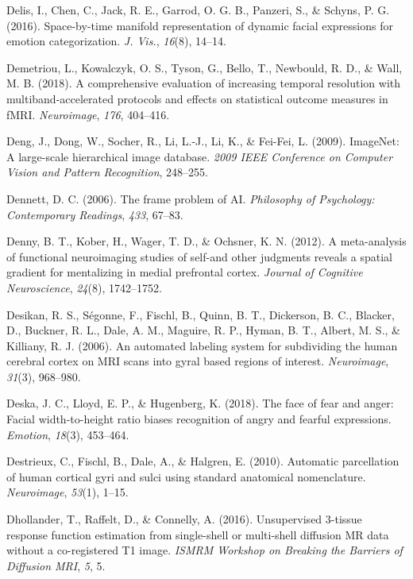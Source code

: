 \documentclass[11pt,american,a4paper,oneside,]{memoir} %
\begin{document}
\leavevmode\hypertarget{ref-Delis2016-zl}{}%
Delis, I., Chen, C., Jack, R. E., Garrod, O. G. B., Panzeri, S., \& Schyns, P. G. (2016). Space-by-time manifold representation of dynamic facial expressions for emotion categorization. \emph{J. Vis.}, \emph{16}(8), 14--14.

\leavevmode\hypertarget{ref-Demetriou2018-xp}{}%
Demetriou, L., Kowalczyk, O. S., Tyson, G., Bello, T., Newbould, R. D., \& Wall, M. B. (2018). A comprehensive evaluation of increasing temporal resolution with multiband-accelerated protocols and effects on statistical outcome measures in fMRI. \emph{Neuroimage}, \emph{176}, 404--416.

\leavevmode\hypertarget{ref-Deng2009-bp}{}%
Deng, J., Dong, W., Socher, R., Li, L.-J., Li, K., \& Fei-Fei, L. (2009). ImageNet: A large-scale hierarchical image database. \emph{2009 IEEE Conference on Computer Vision and Pattern Recognition}, 248--255.

\leavevmode\hypertarget{ref-Dennett2006-el}{}%
Dennett, D. C. (2006). The frame problem of AI. \emph{Philosophy of Psychology: Contemporary Readings}, \emph{433}, 67--83.

\leavevmode\hypertarget{ref-denny2012meta}{}%
Denny, B. T., Kober, H., Wager, T. D., \& Ochsner, K. N. (2012). A meta-analysis of functional neuroimaging studies of self-and other judgments reveals a spatial gradient for mentalizing in medial prefrontal cortex. \emph{Journal of Cognitive Neuroscience}, \emph{24}(8), 1742--1752.

\leavevmode\hypertarget{ref-Desikan2006-gh}{}%
Desikan, R. S., Ségonne, F., Fischl, B., Quinn, B. T., Dickerson, B. C., Blacker, D., Buckner, R. L., Dale, A. M., Maguire, R. P., Hyman, B. T., Albert, M. S., \& Killiany, R. J. (2006). An automated labeling system for subdividing the human cerebral cortex on MRI scans into gyral based regions of interest. \emph{Neuroimage}, \emph{31}(3), 968--980.

\leavevmode\hypertarget{ref-Deska2018-hx}{}%
Deska, J. C., Lloyd, E. P., \& Hugenberg, K. (2018). The face of fear and anger: Facial width-to-height ratio biases recognition of angry and fearful expressions. \emph{Emotion}, \emph{18}(3), 453--464.

\leavevmode\hypertarget{ref-Destrieux2010-rd}{}%
Destrieux, C., Fischl, B., Dale, A., \& Halgren, E. (2010). Automatic parcellation of human cortical gyri and sulci using standard anatomical nomenclature. \emph{Neuroimage}, \emph{53}(1), 1--15.

\leavevmode\hypertarget{ref-Dhollander2016-dx}{}%
Dhollander, T., Raffelt, D., \& Connelly, A. (2016). Unsupervised 3-tissue response function estimation from single-shell or multi-shell diffusion MR data without a co-registered T1 image. \emph{ISMRM Workshop on Breaking the Barriers of Diffusion MRI}, \emph{5}, 5.
\end{document}
